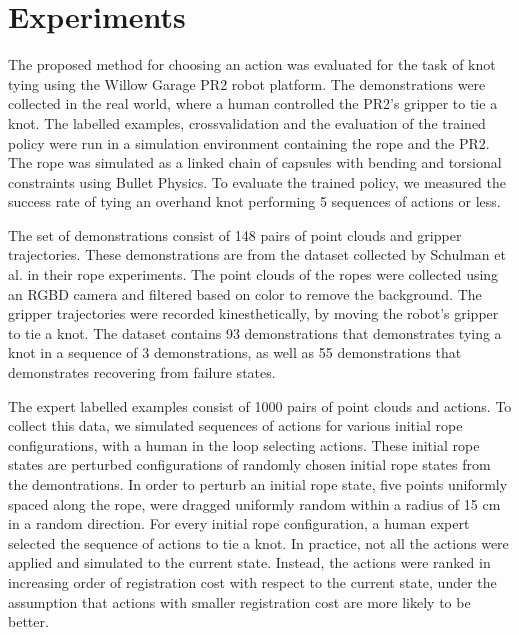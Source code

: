 \section{Experiments}
\label{sec:experiments}

The proposed method for choosing an action was evaluated for the task of knot tying using the Willow Garage PR2 robot platform. 
The demonstrations were collected in the real world, where a human controlled the PR2's gripper to tie a knot.
The labelled examples, crossvalidation and the evaluation of the trained policy were run in a simulation environment containing the rope and the PR2.
The rope was simulated as a linked chain of capsules with bending and torsional constraints using Bullet Physics.
To evaluate the trained policy, we measured the success rate of tying an overhand knot performing 5 sequences of actions or less.

The set of demonstrations consist of 148 pairs of point clouds and gripper trajectories.
These demonstrations are from the dataset collected by Schulman et al. \cite{Schulmanetal_ISRR2013} in their rope experiments.
The point clouds of the ropes were collected using an RGBD camera and filtered based on color to remove the background.
The gripper trajectories were recorded kinesthetically, by moving the robot's gripper to tie a knot.
The dataset contains 93 demonstrations that demonstrates tying a knot in a sequence of 3 demonstrations, as well as 55 demonstrations that demonstrates recovering from failure states.

The expert labelled examples consist of 1000 pairs of point clouds and actions.
To collect this data, we simulated sequences of actions for various initial rope configurations, with a human in the loop selecting actions.
These initial rope states are perturbed configurations of randomly chosen initial rope states from the demontrations.
In order to perturb an initial rope state, five points uniformly spaced along the rope, were dragged uniformly random within a radius of 15 cm in a random direction.
For every initial rope configuration, a human expert selected the sequence of actions to tie a knot.
In practice, not all the actions were applied and simulated to the current state.
Instead, the actions were ranked in increasing order of registration cost with respect to the current state, under the assumption that actions with smaller registration cost are more likely to be better.

